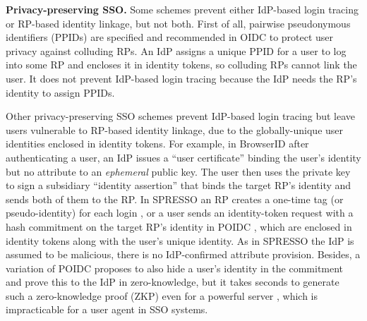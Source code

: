 

\noindent\textbf{Privacy-preserving SSO.}
Some schemes \cite{BrowserID, SPRESSO, NIST2017draft} prevent either IdP-based login tracing or RP-based identity linkage, but not both.
First of all, pairwise pseudonymous identifiers (PPIDs) are specified \cite{OpenIDConnect, SAMLIdentifier} and recommended \cite{NIST2017draft} in OIDC to protect user privacy against colluding RPs.
An IdP assigns a unique PPID for a user to log into some RP and encloses it in identity tokens, so colluding RPs cannot link the user.
It does not prevent IdP-based login tracing because the IdP needs the RP's identity to assign PPIDs.


Other privacy-preserving SSO schemes prevent IdP-based login tracing but leave users vulnerable to RP-based identity linkage, due to the globally-unique user identities enclosed in identity tokens.
For example, in BrowserID \cite{BrowserID} 
after authenticating a user,
    an IdP %
issues a ``user certificate'' binding the user's identity but no attribute to an \emph{ephemeral} public key.
The user then uses the private key to sign a subsidiary ``identity assertion'' that binds the target RP's identity and sends both of them to the RP.
In SPRESSO an RP creates a one-time tag (or pseudo-identity) for each login \cite{SPRESSO}, 
 or a user sends an identity-token request with a hash commitment on the target RP's identity in POIDC \cite{POIDC,save-flow},
        which are enclosed in identity tokens along with the user's unique identity.
As in SPRESSO the IdP is assumed to be malicious, there is no IdP-confirmed attribute provision.
Besides, a variation of POIDC \cite{POIDC} proposes to also hide a user's identity in the commitment and prove this to the IdP in zero-knowledge,
        but it takes seconds to generate such a zero-knowledge proof (ZKP) even for a powerful server \cite{ZKP-BINF,zkp-benchmark,ZKP-GPU},
        which is impracticable for a user agent in SSO systems.

